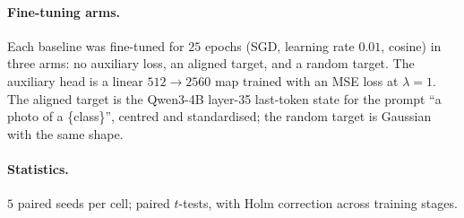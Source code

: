 \begin{revblock}
\paragraph{Fine-tuning arms.} Each baseline was fine-tuned for $25$ epochs
(SGD, learning rate $0.01$, cosine) in three arms: no auxiliary loss, an
aligned target, and a random target. The auxiliary head is a linear
$512{\to}2560$ map trained with an MSE loss at $\lambda{=}1$. The aligned
target is the Qwen3-4B layer-35 last-token state for the prompt ``a photo of
a \{class\}'', centred and standardised; the random target is Gaussian with
the same shape.
\paragraph{Statistics.} $5$ paired seeds per cell; paired $t$-tests, with
Holm correction across training stages.
\end{revblock}
